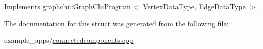 Implements \hyperlink{classgraphchi_1_1_graph_chi_program_ad76f8881627e3c039144e261bfc77770}{graphchi\-::\-Graph\-Chi\-Program$<$ Vertex\-Data\-Type, Edge\-Data\-Type $>$}.



The documentation for this struct was generated from the following file\-:\begin{DoxyCompactItemize}
\item 
example\-\_\-apps/\hyperlink{connectedcomponents_8cpp}{connectedcomponents.\-cpp}\end{DoxyCompactItemize}

